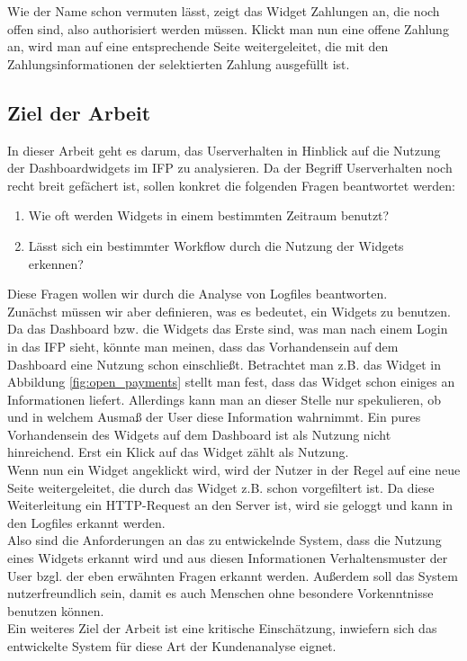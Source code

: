 Wie der Name schon vermuten lässt, zeigt das Widget Zahlungen an, die noch offen sind, also authorisiert werden müssen. Klickt man nun eine offene Zahlung an, wird man auf eine entsprechende Seite weitergeleitet, die mit den Zahlungsinformationen der selektierten Zahlung ausgefüllt ist.

\subsection{Ziel der Arbeit}
\label{sub:Problemstellung}
In dieser Arbeit geht es darum, das Userverhalten in Hinblick auf die Nutzung der Dash\-boardwidgets im IFP zu analysieren. Da der Begriff Userverhalten noch recht breit gefächert ist, sollen konkret die folgenden Fragen beantwortet werden:
\begin{enumerate}
	\item Wie oft werden Widgets in einem bestimmten Zeitraum benutzt? \label{intro:q1}\\
	\item Lässt sich ein bestimmter Workflow durch die Nutzung der Widgets erkennen?\\
\end{enumerate}
Diese Fragen wollen wir durch die Analyse von Logfiles beantworten.\\
Zunächst müssen wir aber definieren, was es bedeutet, ein Widgets zu benutzen. Da das Dashboard bzw. die Widgets das Erste sind, was man nach einem Login in das IFP sieht, könnte man meinen, dass das Vorhandensein auf dem Dashboard eine Nutzung schon einschließt. Betrachtet man z.B. das Widget in Abbildung \ref{fig:open_payments} stellt man fest, dass das Widget schon einiges an Informationen liefert. Allerdings kann man an dieser Stelle nur spekulieren, ob und in welchem Ausmaß der User diese Information wahrnimmt. Ein pures Vorhandensein des Widgets auf dem Dashboard ist als Nutzung nicht hinreichend. Erst ein Klick auf das Widget zählt als Nutzung.\\
Wenn nun ein Widget angeklickt wird, wird der Nutzer in der Regel auf eine neue Seite weitergeleitet, die durch das Widget z.B. schon vorgefiltert ist. Da diese Weiterleitung ein HTTP-Request an den Server ist, wird sie geloggt und kann in den Logfiles erkannt werden.\\
Also sind die Anforderungen an das zu entwickelnde System, dass die Nutzung eines Widgets erkannt wird und aus diesen Informationen Verhaltensmuster der User bzgl. der eben erwähnten Fragen erkannt werden. Außerdem soll das System nutzerfreundlich sein, damit es auch Menschen ohne besondere Vorkenntnisse benutzen können.\\
Ein weiteres Ziel der Arbeit ist eine kritische Einschätzung, inwiefern sich das entwickelte System für diese Art der Kundenanalyse eignet.\\

